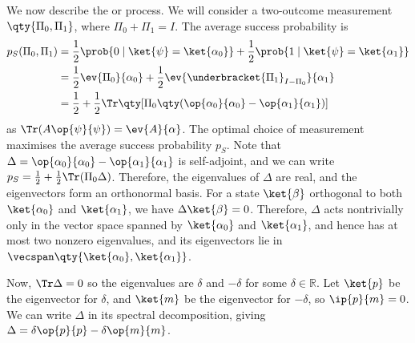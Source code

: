 We now describe the  or  process.
We will consider a two-outcome measurement $\qty{\Pi_0, \Pi_1}$, where $\Pi_0 + \Pi_1 = I$.
The average success probability is
\begin{align*}
    p_S(\Pi_0, \Pi_1) &= \frac{1}{2} \prob{0 \mid \ket{\psi} = \ket{\alpha_0}} + \frac{1}{2} \prob{1 \mid \ket{\psi} = \ket{\alpha_1}} \\
    &= \frac{1}{2}\ev{\Pi_0}{\alpha_0} + \frac{1}{2}\ev{\underbracket{\Pi_1}_{I - \Pi_0}}{\alpha_1} \\
    &= \frac{1}{2} + \frac{1}{2} \Tr \qty[\Pi_0 \qty(\op{\alpha_0}{\alpha_0} - \op{\alpha_1}{\alpha_1})]
\end{align*}
as $\Tr(A\op{\psi}{\psi}) = \ev{A}{\alpha}$.
The optimal choice of measurement maximises the average success probability $p_S$.
Note that $\Delta = \op{\alpha_0}{\alpha_0} - \op{\alpha_1}{\alpha_1}$ is self-adjoint, and we can write $p_S = \frac{1}{2} + \frac{1}{2} \Tr(\Pi_0 \Delta)$.
Therefore, the eigenvalues of $\Delta$ are real, and the eigenvectors form an orthonormal basis.
For a state $\ket{\beta}$ orthogonal to both $\ket{\alpha_0}$ and $\ket{\alpha_1}$, we have $\Delta \ket{\beta} = 0$.
Therefore, $\Delta$ acts nontrivially only in the vector space spanned by $\ket{\alpha_0}$ and $\ket{\alpha_1}$, and hence has at most two nonzero eigenvalues, and its eigenvectors lie in $\vecspan\qty{\ket{\alpha_0}, \ket{\alpha_1}}$.

Now, $\Tr\Delta = 0$ so the eigenvalues are $\delta$ and $-\delta$ for some $\delta \in \mathbb R$.
Let $\ket{p}$ be the eigenvector for $\delta$, and $\ket{m}$ be the eigenvector for $-\delta$, so $\ip{p}{m} = 0$.
We can write $\Delta$ in its spectral decomposition, giving $\Delta = \delta \op{p}{p} - \delta \op{m}{m}$.

